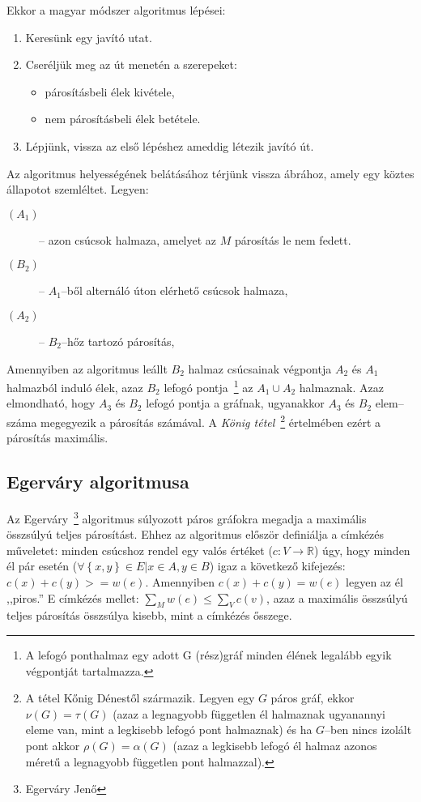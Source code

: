 Ekkor a magyar módszer algoritmus lépései:

\begin{enumerate}
  \item Keresünk egy javító utat.
  \item Cseréljük meg az út menetén a szerepeket:
  	\begin{itemize}
  	\item párosításbeli élek kivétele,
  	\item nem párosításbeli élek betétele. 
	\end{itemize}
  \item Lépjünk, vissza az első lépéshez ameddig létezik javító út.
\end{enumerate}

Az algoritmus helyességének belátásához térjünk vissza  ábrához,
amely egy köztes állapotot szemléltet. Legyen:
\begin{description}
  \item[$(A_1)$] -- azon csúcsok halmaza, amelyet az $M$ párosítás le nem fedett.
  \item[$(B_2)$] -- $A_1$--ből alternáló úton elérhető csúcsok halmaza,
  \item[$(A_2)$] -- $B_2$--hőz tartozó párosítás, 
\end{description}

Amennyiben az algoritmus leállt $B_2$ halmaz csúcsainak végpontja $A_2$ és $A_1$
halmazból induló élek, azaz $B_2$ lefogó pontja~\footnote{A lefogó ponthalmaz egy
adott G (rész)gráf minden élének legalább egyik végpontját tartalmazza.} az $A_1
\cup A_2$ halmaznak. Azaz elmondható, hogy $A_3$ és $B_2$ lefogó pontja a
gráfnak, ugyanakkor $A_3$ és $B_2$ elem--száma megegyezik a párosítás számával.
A \emph{König tétel}~\footnote{ A tétel Kőnig Dénestől származik. Legyen egy $G$
páros gráf, ekkor $\nu(G)=\tau(G)$ (azaz a legnagyobb független él halmaznak
ugyanannyi eleme van, mint a legkisebb lefogó pont halmaznak) és ha $G$--ben
nincs izolált pont akkor $\rho(G)=\alpha(G)$ (azaz a legkisebb lefogó él halmaz
azonos méretű a legnagyobb független pont halmazzal).} értelmében ezért a
párosítás maximális.

\subsection{Egerváry algoritmusa}

Az Egerváry~\footnote{Egerváry Jenő} algoritmus súlyozott páros gráfokra megadja
a maximális összsúlyú teljes párosítást. Ehhez az algoritmus először definiálja
a címkézés műveletet: minden csúcshoz rendel egy valós értéket ($c:V \rightarrow
\mathbb{R}$) úgy, hogy minden él pár esetén ($\forall \left\{x,y\right\} \in E |
x \in A, y \in B$) igaz a következő kifejezés: $c(x)+c(y)>=w(e)$. Amennyiben
$c(x)+c(y)=w(e)$ legyen az él ,,piros.'' E címkézés mellet: $\sum_Mw(e) \leq
\sum_Vc(v)$, azaz a maximális összsúlyú teljes párosítás összsúlya kisebb, mint
a címkézés ősszege.

